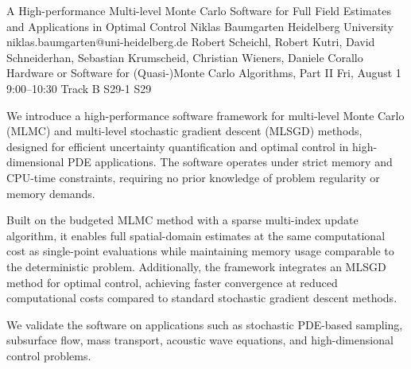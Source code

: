 \begin{talk}
  {A High-performance Multi-level Monte Carlo Software for Full Field Estimates and Applications in Optimal Control}%
  {Niklas Baumgarten}%
  {Heidelberg University}%
  {niklas.baumgarten@uni-heidelberg.de}%
  {Robert Scheichl, Robert Kutri, David Schneiderhan, Sebastian Krumscheid, Christian Wieners, Daniele Corallo}%
  {Hardware or Software for (Quasi-)Monte Carlo Algorithms, Part II}%
  {Fri, August 1 9:00–10:30 Track B}%
  {S29-1}%
  {S29}%
        

        We introduce a high-performance software framework for multi-level Monte Carlo (MLMC)
        and multi-level stochastic gradient descent (MLSGD) methods,
        designed for efficient uncertainty quantification and optimal control in high-dimensional PDE applications.
        The software operates under strict memory and CPU-time constraints,
        requiring no prior knowledge of problem regularity or memory demands.

        Built on the budgeted MLMC method with a sparse multi-index update algorithm,
        it enables full spatial-domain estimates at the same computational cost as single-point
        evaluations while maintaining memory usage comparable to the deterministic problem.
        Additionally, the framework integrates an MLSGD method for optimal control,
        achieving faster convergence at reduced computational costs compared to standard
        stochastic gradient descent methods.

        We validate the software on applications such as stochastic PDE-based sampling, subsurface flow,
        mass transport, acoustic wave equations, and high-dimensional control problems.


\end{talk}

